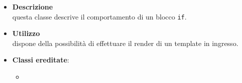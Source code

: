\label{\nogloxy{swedesigner::server::project::ParsedIf}}
\begin{itemize}
\item \textbf{Descrizione}\\
questa classe descrive il comportamento di un blocco \texttt{if}.
\item \textbf{Utilizzo}\\
dispone della possibilità di effettuare il render di un template in ingresso.
\item \textbf{Classi ereditate}:
\begin{itemize}
\item \hyperref[\nogloxy{swedesigner::server::project::ParsedInstruction}]{}
\end{itemize}
\end{itemize}

